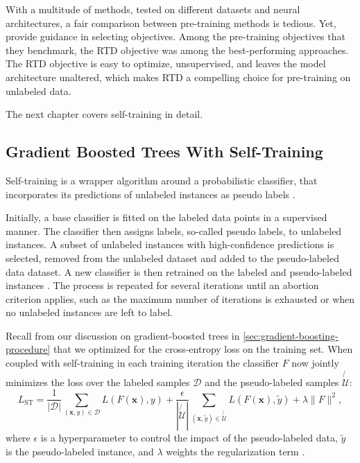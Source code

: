 With a multitude of methods, tested on different datasets and neural architectures, a fair comparison between pre-training methods is tedious. Yet, \textcite[\checkmark][2-3]{rubachevRevisitingPretrainingObjectives2022} provide guidance in selecting objectives. Among the pre-training objectives that they benchmark, the \gls{RTD} objective was among the best-performing approaches. The \gls{RTD} objective is easy to optimize, unsupervised, and leaves the model architecture unaltered, which makes \gls{RTD} a compelling choice for pre-training on unlabeled data.

The next chapter covers self-training in detail.

\subsection{Gradient Boosted Trees With Self-Training}\label{sec:extensions-to-gradient-boosted-trees}

Self-training is a wrapper algorithm around a probabilistic classifier, that incorporates its predictions of unlabeled instances as pseudo labels \autocite[\checkmark][190]{yarowskyUnsupervisedWordSense1995}.

Initially, a base classifier is fitted on the labeled data points in a supervised manner. The classifier then assigns labels, so-called pseudo labels, to unlabeled instances. A subset of unlabeled instances with high-confidence predictions is selected, removed from the unlabeled dataset and added to the pseudo-labeled data dataset. A new classifier is then retrained on the labeled and pseudo-labeled instances \autocite[\checkmark][190--192]{yarowskyUnsupervisedWordSense1995}. The process is repeated for several iterations until an abortion criterion applies, such as the maximum number of iterations is exhausted or when no unlabeled instances are left to label.

Recall from our discussion on gradient-boosted trees in \cref{sec:gradient-boosting-procedure} that we optimized for the cross-entropy loss on the training set. When coupled with self-training in each training iteration the classifier $F$ now jointly minimizes the loss over the labeled samples $\mathcal{D}$ and the pseudo-labeled samples $\not{\mathcal{U}}$:
\begin{equation}
    L_{\mathrm{ST}}=\frac{1}{\left|\mathcal{D}\right|} \sum_{(\mathbf{x}, y) \in \mathcal{D}} L(F(\mathbf{x}), y)+\frac{\epsilon}{\left|\not{\mathcal{U}}\right|} \sum_{(\mathbf{x}, \tilde{y}) \in \not{\mathcal{U}}} L(F(\mathbf{x}), \tilde{y})+\lambda\|F\|^2,
\end{equation}
where $\epsilon$ is a hyperparameter to control the impact of the pseudo-labeled data, $\tilde{y}$ is the pseudo-labeled instance, and $\lambda$ weights the regularization term \autocite[\checkmark][4]{aminiSelfTrainingSurvey2023}.

